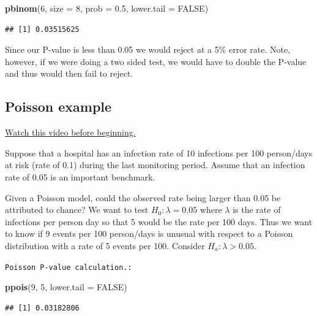 \documentclass[]{article}
\newenvironment{Shaded}{\begin{snugshade}}{\end{snugshade}}
\newcommand{\KeywordTok}[1]{\textcolor[rgb]{0.13,0.29,0.53}{\textbf{{#1}}}}
\newcommand{\DataTypeTok}[1]{\textcolor[rgb]{0.13,0.29,0.53}{{#1}}}
\newcommand{\DecValTok}[1]{\textcolor[rgb]{0.00,0.00,0.81}{{#1}}}
\newcommand{\FloatTok}[1]{\textcolor[rgb]{0.00,0.00,0.81}{{#1}}}
\newcommand{\OtherTok}[1]{\textcolor[rgb]{0.56,0.35,0.01}{{#1}}}
\newcommand{\NormalTok}[1]{{#1}}
\begin{document}
\begin{Shaded}
\begin{Highlighting}[]
\KeywordTok{pbinom}\NormalTok{(}\DecValTok{6}\NormalTok{, }\DataTypeTok{size =} \DecValTok{8}\NormalTok{, }\DataTypeTok{prob =} \FloatTok{0.5}\NormalTok{, }\DataTypeTok{lower.tail =} \OtherTok{FALSE}\NormalTok{)}
\end{Highlighting}
\end{Shaded}

\begin{verbatim}
## [1] 0.03515625
\end{verbatim}

Since our P-value is less than 0.05 we would reject at a 5\% error rate.
Note, however, if we were doing a two sided test, we would have to
double the P-value and thus would then fail to reject.

\subsection{Poisson example}\label{poisson-example}

\href{http://youtu.be/Tcw2OVyEX3s?list=PLpl-gQkQivXiBmGyzLrUjzsblmQsLtkzJ}{Watch
this video before beginning.}

Suppose that a hospital has an infection rate of 10 infections per 100
person/days at risk (rate of 0.1) during the last monitoring period.
Assume that an infection rate of 0.05 is an important benchmark.

Given a Poisson model, could the observed rate being larger than 0.05 be
attributed to chance? We want to test $H_0: \lambda = 0.05$ where
$\lambda$ is the rate of infections per person day so that 5 would be
the rate per 100 days. Thus we want to know if 9 events per 100
person/days is unusual with respect to a Poisson distribution with a
rate of 5 events per 100. Consider $H_a: \lambda > 0.05$.

\vspace{1pc}

\verb;Poisson P-value calculation.:;

\begin{Shaded}
\begin{Highlighting}[]
\KeywordTok{ppois}\NormalTok{(}\DecValTok{9}\NormalTok{, }\DecValTok{5}\NormalTok{, }\DataTypeTok{lower.tail =} \OtherTok{FALSE}\NormalTok{)}
\end{Highlighting}
\end{Shaded}

\begin{verbatim}
## [1] 0.03182806
\end{verbatim}
\end{document}
